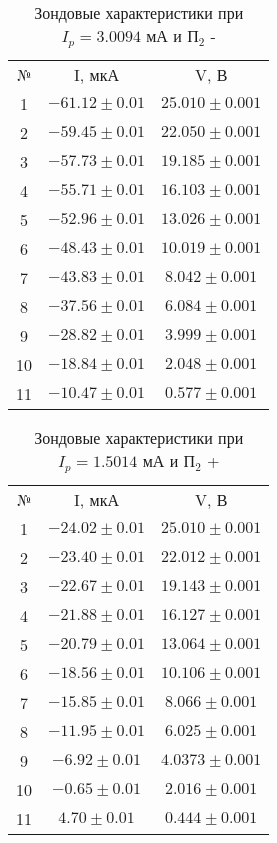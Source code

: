 \documentclass[a4paper]{article}
\begin{document}
        \begin{table}[h]
    \centering
        \begin{tabular}{|c|c|c|}
        \cline{1-3}
        № & I, мкА& V, В\\ \cline{1-3}
        1 & $-61.12\pm 0.01$& $25.010 \pm 0.001$\\ \cline{1-3}
        2 & $-59.45\pm 0.01$& $22.050 \pm 0.001$\\ \cline{1-3}
        3 & $-57.73\pm 0.01$& $19.185 \pm 0.001$\\ \cline{1-3}
        4 & $-55.71\pm 0.01$& $16.103 \pm 0.001$\\ \cline{1-3}
        5 & $-52.96\pm 0.01$& $13.026 \pm 0.001$\\ \cline{1-3}
        6 & $-48.43\pm 0.01$& $10.019 \pm 0.001$\\ \cline{1-3}
        7 & $-43.83\pm 0.01$& $8.042 \pm 0.001$\\ \cline{1-3}
        8 & $-37.56\pm 0.01$& $6.084 \pm 0.001$\\ \cline{1-3}
        9 & $-28.82\pm 0.01$& $3.999 \pm 0.001$\\ \cline{1-3}
        10 & $-18.84\pm 0.01$& $2.048 \pm 0.001$\\ \cline{1-3}
        11 & $-10.47\pm 0.01$& $0.577 \pm 0.001$\\ \cline{1-3}
        \end{tabular}
        \caption{Зондовые характеристики при $I_p = 3.0094$ мА и $\text{П}_2$ -}
        \label{tab:my_label}
    \end{table}

        \begin{table}[h]
    \centering
        \begin{tabular}{|c|c|c|}
        \cline{1-3}
        № & I, мкА& V, В\\ \cline{1-3}
        1 & $-24.02\pm 0.01$& $25.010 \pm 0.001$\\ \cline{1-3}
        2 & $-23.40\pm 0.01$& $22.012 \pm 0.001$\\ \cline{1-3}
        3 & $-22.67\pm 0.01$& $19.143 \pm 0.001$\\ \cline{1-3}
        4 & $-21.88\pm 0.01$& $16.127 \pm 0.001$\\ \cline{1-3}
        5 & $-20.79\pm 0.01$& $13.064 \pm 0.001$\\ \cline{1-3}
        6 & $-18.56\pm 0.01$& $10.106 \pm 0.001$\\ \cline{1-3}
        7 & $-15.85\pm 0.01$& $8.066 \pm 0.001$\\ \cline{1-3}
        8 & $-11.95\pm 0.01$& $6.025 \pm 0.001$\\ \cline{1-3}
        9 & $-6.92\pm 0.01$& $4.0373 \pm 0.001$\\ \cline{1-3}
        10 & $-0.65\pm 0.01$& $2.016 \pm 0.001$\\ \cline{1-3}
        11 & $4.70\pm 0.01$& $0.444 \pm 0.001$\\ \cline{1-3}
        \end{tabular}
        \caption{Зондовые характеристики при $I_p = 1.5014$ мА и $\text{П}_2$ +}
        \label{tab:my_label}
    \end{table}
\end{document}
